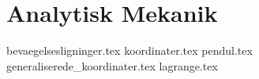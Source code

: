 \documentclass[crop=false, class=memoir]{standalone}
\begin{document}
\chapter{Analytisk Mekanik} \label{chap:mek}
{bevaegelsesligninger.tex}
{koordinater.tex}
{pendul.tex}
{generaliserede_koordinater.tex}
{lagrange.tex}
\end{document}

